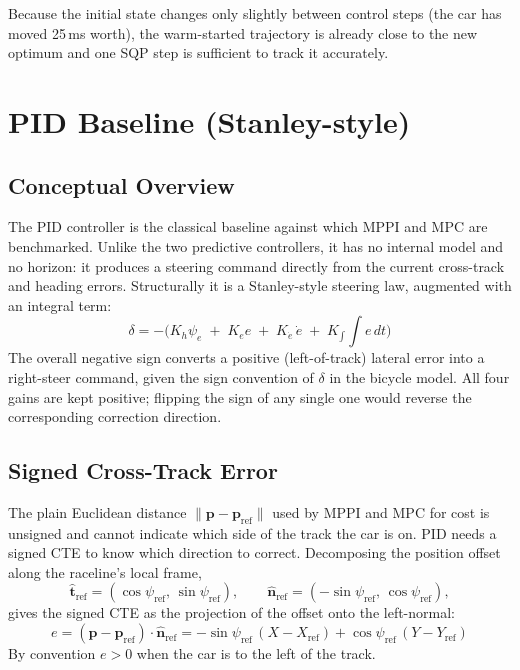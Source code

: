 \documentclass[11pt]{article}
\begin{document}
Because the initial state changes only slightly between control steps (the car
has moved 25\,ms worth), the warm-started trajectory is already close to the new
optimum and one SQP step is sufficient to track it accurately.


\section{PID Baseline (Stanley-style)}

\subsection{Conceptual Overview}

The PID controller is the classical baseline against which MPPI and MPC are
benchmarked.  Unlike the two predictive controllers, it has no internal model
and no horizon: it produces a steering command directly from the
current cross-track and heading errors.  Structurally it is a
Stanley-style steering law, augmented with an integral term:
\[
\delta = -\big(K_h \psi_e \;+\; K_e e \;+\; K_{\dot e}\, \dot e \;+\; K_{\int} \!\!\int e\, dt\big)
\]
The overall negative sign converts a positive (left-of-track) lateral error
into a right-steer command, given the sign convention of $\delta$ in the
bicycle model.  All four gains are kept positive; flipping the sign of any
single one would reverse the corresponding correction direction.

\subsection{Signed Cross-Track Error}

The plain Euclidean distance $\|\bm{p} - \bm{p}_{\text{ref}}\|$ used by MPPI
and MPC for cost is unsigned and cannot indicate which side of the track the
car is on.  PID needs a signed CTE to know which direction to
correct.  Decomposing the position offset along the raceline's local frame,
\[
\hat{\bm{t}}_{\text{ref}} = (\cos\psi_{\text{ref}},\, \sin\psi_{\text{ref}}),
\qquad
\hat{\bm{n}}_{\text{ref}} = (-\sin\psi_{\text{ref}},\, \cos\psi_{\text{ref}}),
\]
gives the signed CTE as the projection of the offset onto the left-normal:
\[
e = (\bm{p} - \bm{p}_{\text{ref}}) \cdot \hat{\bm{n}}_{\text{ref}}
  = -\sin\psi_{\text{ref}}\,(X - X_{\text{ref}}) + \cos\psi_{\text{ref}}\,(Y - Y_{\text{ref}})
\]
By convention $e > 0$ when the car is to the left of the track.
\end{document}
